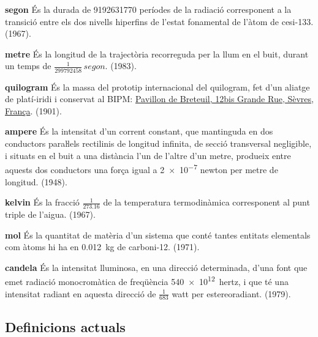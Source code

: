 \begin{list}{}
   {\setlength{\labelwidth}{22mm} \setlength{\leftmargin}{22mm} \setlength{\labelsep}{2mm}}
   \item[\textbf{segon}] És la durada de \num{9192631770} períodes de la
   radiació corresponent a la transició entre els dos nivells
  hiperfins de l'estat fonamental de l'àtom de cesi-133. (1967).
   \item[\textbf{metre}] És la longitud de la trajectòria recorreguda per la llum
   en el buit, durant un temps de $\frac{1}{\num{299792458}}\unit{\,segon}$. (1983).
   \item[\textbf{quilogram}] És la massa del prototip internacional del quilogram, fet d'un aliatge de platí-iridi i
    conservat al BIPM: \href{https://goo.gl/maps/f3XvdjZDTVRgQfsYA}{Pavillon de Breteuil,  12bis Grande Rue, Sèvres, França}. (1901).   
   \item[\textbf{ampere}] És la intensitat d'un corrent constant,
   que mantinguda en dos conductors paraŀlels rectilinis de longitud
   infinita, de secció transversal negligible, i situats en el buit a una
   distància l'un de l'altre d'un metre, produeix entre
   aquests dos conductors  una força igual a \num{2e-7} newton per metre de longitud. (1948).
   \item[\textbf{kelvin}] És la fracció $\frac{1}{\num{273,16}}$ de la temperatura
   termodinàmica corresponent al punt triple de l'aigua. (1967).
   \item[\textbf{mol}] És la quantitat de matèria d'un sistema que conté tantes
   entitats elementals com àtoms hi ha en \qty{0,012}{kg} de carboni-12. (1971).
   \item[\textbf{candela}] És la intensitat lluminosa, en una direcció determinada,
   d'una font que emet radiació monocromàtica de freqüència \qty{540e12}{hertz}, i
   que té una intensitat radiant en aquesta direcció de $\frac{1}{683}$ watt per estereoradiant. (1979).
\end{list}

\subsection{Definicions actuals}

